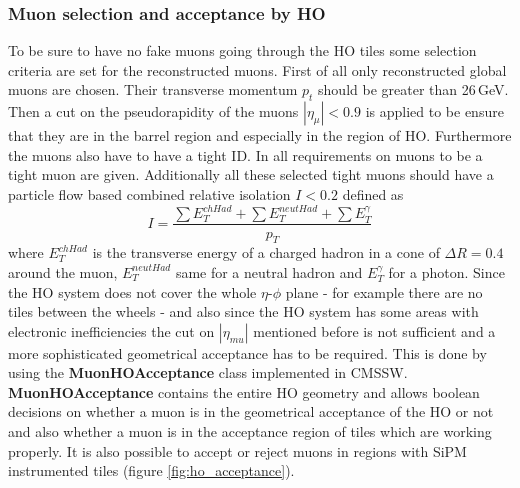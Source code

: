 		\subsubsection{Muon selection and acceptance by HO}
		\label{thesectionhere}
			To be sure to have no fake muons going through the HO tiles some selection criteria are set for the reconstructed muons.
			First of all only reconstructed global muons are chosen.
			Their transverse momentum $p_t$ should be greater than 26\,GeV.
			Then a cut on the pseudorapidity of the muons $|\eta_\mu| < 0.9$ is applied to be ensure that they are in the barrel region and especially in the region of HO.
			Furthermore the muons also have to have a tight ID.
			In \cite{CMS-PAPER-MUO-10-004} all requirements on muons to be a tight muon are given.
			Additionally all these selected tight muons should have a particle flow based combined relative isolation $I<0.2$ defined as
			\begin{equation}
				I = \frac{\sum{E_T^{chHad}} + \sum{E_T^{neutHad}} + \sum{E_T^\gamma}}{p_T}
			\end{equation}
			where $E_T^{chHad}$ is the transverse energy of a charged hadron in a cone of $\Delta R = 0.4$ around the muon, $E_T^{neutHad}$ same for a neutral hadron and $E_T^\gamma$ for a photon.
			Since the HO system does not cover the whole $\eta$-$\phi$ plane - for example there are no tiles between the wheels - and also since the HO system has some areas with electronic inefficiencies the
			cut on $|\eta_{mu}|$ mentioned before is not sufficient and a more sophisticated geometrical acceptance has to be required.
			This is done by using the \textbf{MuonHOAcceptance} class implemented in CMSSW.
			\textbf{MuonHOAcceptance} contains the entire HO geometry and allows boolean decisions on whether a muon is in the geometrical acceptance of the HO or not and also whether a muon is in the
			acceptance region of tiles which are working properly.
			It is also possible to accept or reject muons in regions with SiPM instrumented tiles (figure \ref{fig:ho_acceptance}).

